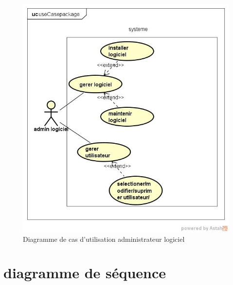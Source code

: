	  \begin{figure}[h]
	  \centering
	   \includegraphics[scale=0.6]{Chapitre2/images/ucdadminlogiciel}
	    \caption{Diagramme de cas d'utilisation administrateur logiciel}
	  \end{figure}
	 
	  \newpage
	  
	  \section{diagramme de séquence}
	  
